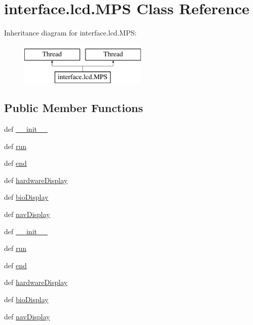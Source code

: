 \hypertarget{classinterface_1_1lcd_1_1MPS}{}\section{interface.\+lcd.\+M\+P\+S Class Reference}
\label{classinterface_1_1lcd_1_1MPS}
Inheritance diagram for interface.\+lcd.\+M\+P\+S\+:\begin{figure}[H]
\begin{center}
\leavevmode
\includegraphics[height=2.000000cm]{classinterface_1_1lcd_1_1MPS}
\end{center}
\end{figure}
\subsection*{Public Member Functions}
\begin{DoxyCompactItemize}
\item 
def \hyperlink{classinterface_1_1lcd_1_1MPS_a52eee073eb72cffe7865fcc59c83bf95}{\+\_\+\+\_\+init\+\_\+\+\_\+}
\item 
def \hyperlink{classinterface_1_1lcd_1_1MPS_a7c696e6242aa5e524a426ce73a8a8050}{run}
\item 
def \hyperlink{classinterface_1_1lcd_1_1MPS_ad9481e02c1fc887aa940144141074bc3}{end}
\item 
def \hyperlink{classinterface_1_1lcd_1_1MPS_a56a76849d7a11e2d4768e8813a6e6c19}{hardware\+Display}
\item 
def \hyperlink{classinterface_1_1lcd_1_1MPS_aa5ae91eb14143474a31fac7754c41228}{bio\+Display}
\item 
def \hyperlink{classinterface_1_1lcd_1_1MPS_a8ea7992a675b520b586cb53d276c6f54}{nav\+Display}
\item 
def \hyperlink{classinterface_1_1lcd_1_1MPS_a52eee073eb72cffe7865fcc59c83bf95}{\+\_\+\+\_\+init\+\_\+\+\_\+}
\item 
def \hyperlink{classinterface_1_1lcd_1_1MPS_a7c696e6242aa5e524a426ce73a8a8050}{run}
\item 
def \hyperlink{classinterface_1_1lcd_1_1MPS_ad9481e02c1fc887aa940144141074bc3}{end}
\item 
def \hyperlink{classinterface_1_1lcd_1_1MPS_a56a76849d7a11e2d4768e8813a6e6c19}{hardware\+Display}
\item 
def \hyperlink{classinterface_1_1lcd_1_1MPS_aa5ae91eb14143474a31fac7754c41228}{bio\+Display}
\item 
def \hyperlink{classinterface_1_1lcd_1_1MPS_a8ea7992a675b520b586cb53d276c6f54}{nav\+Display}
\end{DoxyCompactItemize}
